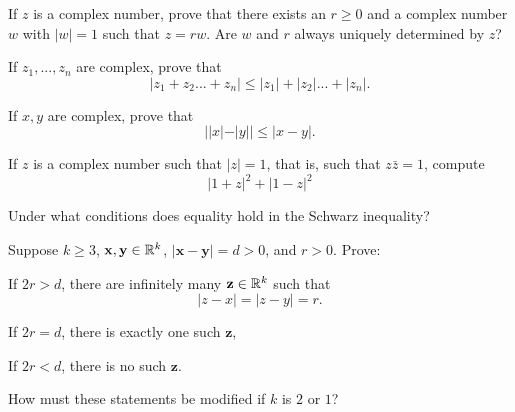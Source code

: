 \begin{myExercise}
    If $z$ is a complex number, prove that there exists an $r \geq 0$ and a complex number
    $w$ with $|w| = 1$ such that $z =rw$. Are $w$ and $r$ always uniquely determined by $z$?
\end{myExercise}

\begin{myExercise}
    If $z_1 ,..., z_n$ are complex, prove that
    \begin{equation*}
        |z_1 + z_2 ...+ z_n| \leq 
        |z_1| + |z_2| ...+ |z_n|.
    \end{equation*}
\end{myExercise}

\begin{myExercise}
    If $x, y$ are complex, prove that
    \begin{equation*}
        ||x|-|y|| \leq |x-y|.
    \end{equation*}
\end{myExercise}

\begin{myExercise}
    If $z$ is a complex number such that $|z| = 1$, that is, such that $z\bar{z} = 1$, compute
    \begin{equation*}
        |1+z|^2 + |1-z|^2
    \end{equation*}
\end{myExercise}

\begin{myExercise}
    Under what conditions does equality hold in the Schwarz inequality?
\end{myExercise}

\begin{myExercise}
    Suppose $k \geq 3$, $\mathbf{x}, \mathbf{y} \in {\protect\mathbb R}^k$, $|\mathbf{x} - \mathbf{y}| =d>0$, and $r >0$. Prove:
    \begin{asparaenum}[(a)]
        \item If $2r > d$, there are infinitely many $\mathbf{z} \in {\protect\mathbb R}^k$ such that
        \begin{equation*}
            |z-x| =|z-y| =r.
        \end{equation*}        
        \item If $2r = d$, there is exactly one such $\mathbf{z}$,
        \item If $2r < d$, there is no such $\mathbf{z}$.
    \end{asparaenum}
    How must these statements be modified if $k$ is $2$ or $1$?
\end{myExercise}

